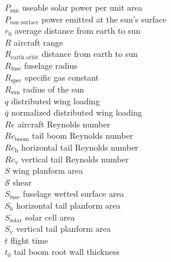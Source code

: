 \begin{multicols}{2}
\begin{tabbing}
$P_{\text{sun}}$ \> useable solar power per unit area \\ %
$P_{\text{sun surface}}$ \> power emitted at the sun's surface \\ %
$r_0$ \> average distance from earth to sun \\
$R$ \> aircraft range \\ %
$R_{\text{earth orbit}}$ \> distance from earth to sun \\
$R_{\text{fuse}}$ \> fuselage radius \\ %
$R_{\text{spec}}$ \> specific gas constant \\ %
$R_{\text{sun}}$ \> radius of the sun \\
$q$ \> distributed wing loading \\ %
$\bar{q}$ \> normalized distributed wing loading \\
$Re$ \> aircraft Reynolds number \\
$Re_{\text{boom}}$ \> tail boom Reynolds number \\
$Re_{\text{h}}$ \> horizontal tail Reynolds number \\
$Re_{\text{v}}$ \> vertical tail Reynolds number \\
$S$ \> wing planform area \\ %
$\mathcal{S}$ \> shear \DIFdelbegin {}\DIFdelend \DIFaddbegin {}\DIFaddend \\ %
$S_{\text{fuse}}$ \> fuselage wetted surface area \\ %
$S_{\text{h}}$ \> horizontal tail planform area \\ %
$S_{\text{solar}}$ \> solar cell area \\ %
$S_{\text{v}}$ \> vertical tail planform area \\ %
$t$ \> flight time \\ %
$t_0$ \> tail boom root wall thickness \\ %

\end{tabbing}
\end{multicols}
